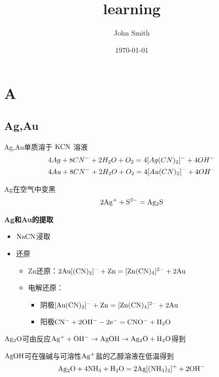 \documentclass[UTF8]{article}
\title{learning}
\author{John Smith}
\date{\today}
\begin{document}
\section{A}

\subsection{Ag,Au}

Ag,Au单质溶于 $ \rm K CN$ 溶液
\begin{equation}
\begin{aligned}
    \rm \nonumber 
    &4Ag+8 {CN}^{-} +2H_{2}O+O_{2} = 4[Ag(CN)_{2}]^{-} +4OH^{-} \\
    &4Au+8 {CN}^{-} +2H_{2}O+O_{2} = 4[Au(CN)_{2}]^{-} +4OH^{-}
\end{aligned}
\end{equation}

Ag在空气中变黑
\begin{equation}
    \begin{aligned}
        \rm \nonumber
        2Ag^{+}+S^{2-} = Ag_{2}S 
    \end{aligned}
\end{equation}

\textbf{Ag和Au的提取} 
\begin{itemize}[leftmargin=50pt]
    \setlength{\itemsep}{0pt}
    \setlength{\parsep}{0pt}
    \setlength{\parskip}{0pt}
    \item $ \rm NaCN $浸取
    \item 还原
    \begin{itemize}
        \item[] Zn还原：$\rm 2Au[(CN)_{2}]^{-}+Zn=[Zn(CN)_{4}]^{2-}+2Au$
        \item[] 电解还原：
        \begin{itemize}
            \item[] 阴极$\rm [Au(CN)_{2}]^{-} +Zn = [Zn(CN)_{4}]^{2-}+2Au$ 
            \item[] 阳极$\rm CN^{-}+2OH^{-} -2e^{-} = CNO^{-}+H_{2}O$
        \end{itemize}
    \end{itemize}
\end{itemize}

$\rm Ag_{2}O$可由反应$\rm Ag^{+}+OH^{-} \rightarrow AgOH \rightarrow Ag_{2}O + H_{2}O$得到

$\rm AgOH$可在强碱与可溶性$\rm Ag^{+}$盐的乙醇溶液在低温得到
\[
\rm Ag_{2}O+4NH_{3}+H_{2}O = 2Ag[(NH_{3})_{2}]^{+}+2OH^{-}
\]
\end{document}
